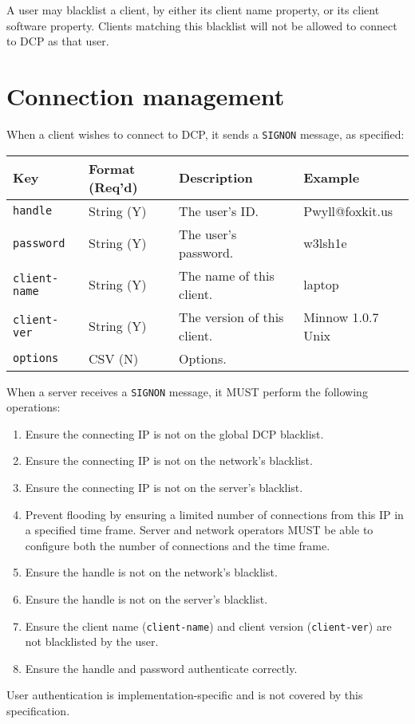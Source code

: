 A user may blacklist a client, by either its client name property, or its client
software property.  Clients matching this blacklist will not be allowed to
connect to DCP as that user.



\section{Connection management}
\sectionrule

When a client wishes to connect to DCP, it sends a \texttt{SIGNON} message, as
specified:

\begin{tabular}{l|l|l|l}
  \hline
  Key & Format (Req'd) & Description & Example \\
  \hline
  \hline
  \texttt{handle}       & String (Y) & The user's ID.           & Pwyll@foxkit.us \\
  \texttt{password}     & String (Y) & The user's password.     & w3lsh1e \\
  \texttt{client-name}  & String (Y) & The name of this client. & laptop \\
  \texttt{client-ver}   & String (Y) & The version of this client. & Minnow 1.0.7 Unix \\
  \texttt{options}      & CSV    (N) & Options.                 & \\
  \hline
\end{tabular}

When a server receives a \texttt{SIGNON} message, it MUST perform the following
operations:

\begin{enumerate}
  \item{Ensure the connecting IP is not on the global DCP blacklist.}
  \item{Ensure the connecting IP is not on the network's blacklist.}
  \item{Ensure the connecting IP is not on the server's blacklist.}
  \item{Prevent flooding by ensuring a limited number of connections from this
  IP in a specified time frame.  Server and network operators MUST be able to
  configure both the number of connections and the time frame.}
  \item{Ensure the handle is not on the network's blacklist.}
  \item{Ensure the handle is not on the server's blacklist.}
  \item{Ensure the client name (\texttt{client-name}) and client version
  (\texttt{client-ver}) are not blacklisted by the user.}
  \item{Ensure the handle and password authenticate correctly.}
\end{enumerate}

User authentication is implementation-specific and is not covered by this
specification.
